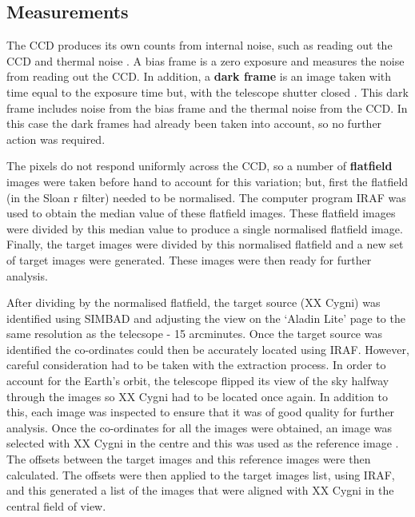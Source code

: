 \documentclass{article}
\begin{document}
\subsection{Measurements}
\label{ssec:measurements}
The CCD produces its own counts from internal noise, such as reading out the CCD and thermal noise \cite{Paper01}. A bias frame is a zero exposure and measures the noise from reading out the CCD. In addition, a \textbf{dark frame} is an image taken with time equal to the exposure time but, with the telescope shutter closed \cite{Paper01}. This dark frame includes noise from the bias frame and the thermal noise from the CCD. In this case the dark frames had already been taken into account, so no further action was required.

\vspace{2mm}
\noindent
The pixels do not respond uniformly across the CCD, so a number of \textbf{flatfield} images were taken before hand to account for this variation; but, first the flatfield (in the Sloan r filter) needed to be normalised. The computer program IRAF was used to obtain the median value of these flatfield images. These flatfield images were divided by this median value to produce a single normalised flatfield image. Finally, the target images were divided by this normalised flatfield and a new set of target images were generated. These images were then ready for further analysis.   

\vspace{2mm}
\noindent
After dividing by the normalised flatfield, the target source (XX Cygni) was identified using SIMBAD \cite{Web01} and adjusting the view on the `Aladin Lite' page \cite{Web02} to the same resolution as the telecsope - 15 arcminutes. Once the target source was identified the co-ordinates could then be accurately located using IRAF. However, careful consideration had to be taken with the extraction process. In order to account for the Earth's orbit, the telescope flipped its view of the sky halfway through the images so XX Cygni had to be located once again. In addition to this, each image was inspected to ensure that it was of good quality for further analysis. Once the co-ordinates for all the images were obtained, an image was selected with XX Cygni in the centre and this was used as the reference image \cite{Paper03}. The offsets between the target images and this reference images were then calculated. The offsets were then applied to the target images list, using IRAF, and this generated a list of the images that were aligned with XX Cygni in the central field of view.
\end{document}
